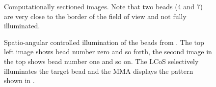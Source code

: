 \begin{figure}[H]
  \centering
  \caption{Computationally sectioned images. Note that two beads (4
    and 7) are very close to the border of the field of view and not
    fully illuminated.}
  \label{fig:m_sec}
\end{figure}


\begin{figure}[H]
  \centering
  \caption{Spatio-angular controlled illumination of the beads from
    . The top left image shows bead number zero and
    so forth, the second image in the top shows bead number one and so
    on. The LCoS selectively illuminates the target bead and the MMA
    displays the pattern shown in .}
  \label{fig:m_ang}
\end{figure}


\begin{figure}[!hbt]
  \centering
  \caption{}
  \label{fig:montage-ang}
\end{figure}




